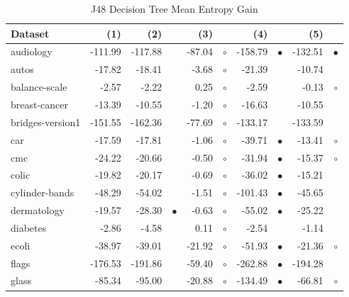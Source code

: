 \begin{table}[thb]
\caption{\label{j48meg}J48 Decision Tree Mean Entropy Gain}
\footnotesize
{\centering \begin{tabular}{lrr@{\hspace{0.1cm}}cr@{\hspace{0.1cm}}cr@{\hspace{0.1cm}}cr@{\hspace{0.1cm}}c}
\\
\hline
Dataset & (1)& (2) & & (3) & & (4) & & (5) & \\
\hline
audiology & -111.99 & -117.88 &           &  -87.04 &  $\circ$ & -158.79 & $\bullet$ & -132.51 & $\bullet$\\
autos &  -17.82 &  -18.41 &           &   -3.68 &  $\circ$ &  -21.39 &           &  -10.74 &          \\
balance-scale &   -2.57 &   -2.22 &           &    0.25 &  $\circ$ &   -2.59 &           &   -0.13 &   $\circ$\\
breast-cancer &  -13.39 &  -10.55 &           &   -1.20 &  $\circ$ &  -16.63 &           &  -10.55 &          \\
bridges-version1 & -151.55 & -162.36 &           &  -77.69 &  $\circ$ & -133.17 &           & -133.59 &          \\
car &  -17.59 &  -17.81 &           &   -1.06 &  $\circ$ &  -39.71 & $\bullet$ &  -13.41 &   $\circ$\\
cmc &  -24.22 &  -20.66 &           &   -0.50 &  $\circ$ &  -31.94 & $\bullet$ &  -15.37 &   $\circ$\\
colic &  -19.82 &  -20.17 &           &   -0.69 &  $\circ$ &  -36.02 & $\bullet$ &  -15.21 &          \\
cylinder-bands &  -48.29 &  -54.02 &           &   -1.51 &  $\circ$ & -101.43 & $\bullet$ &  -45.65 &          \\
dermatology &  -19.57 &  -28.30 & $\bullet$ &   -0.63 &  $\circ$ &  -55.02 & $\bullet$ &  -25.22 &          \\
diabetes &   -2.86 &   -4.58 &           &    0.11 &  $\circ$ &   -2.54 &           &   -1.14 &          \\
ecoli &  -38.97 &  -39.01 &           &  -21.92 &  $\circ$ &  -51.93 & $\bullet$ &  -21.36 &   $\circ$\\
flags & -176.53 & -191.86 &           &  -59.40 &  $\circ$ & -262.88 & $\bullet$ & -194.28 &          \\
glass &  -85.34 &  -95.00 &           &  -20.88 &  $\circ$ & -134.49 & $\bullet$ &  -66.81 &   $\circ$\\

\end{tabular}}
\end{table}
